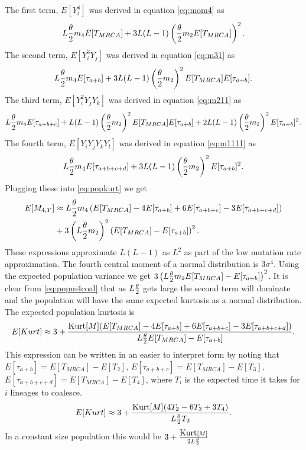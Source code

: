 The first term, $E[Y_i^4]$ was derived in equation \eqref{eq:mom4} as
\begin{equation*}
  L\frac{\theta}{2} m_4 E[T_{MRCA}] + 3L(L-1)\left( \frac{\theta}{2} m_2 E[T_{MRCA}] \right)^2.
\end{equation*}
The second term, $E[Y_i^3Y_j]$ was derived in equation \eqref{eq:m31} as
\begin{equation*}
  L \frac{\theta}{2} m_4 E[\tau_{a+b}] + 3L(L-1) \left(\frac{\theta}{2} m_2\right)^2 E[T_{MRCA}]E[\tau_{a+b}].
\end{equation*}
The third term, $E[Y_i^2Y_jY_k]$ was derived in equation \eqref{eq:m211} as
\begin{equation*}
  L \frac{\theta}{2} m_4 E[\tau_{a+b+c}] + L(L-1)\left(\frac{\theta}{2} m_2\right)^2E[T_{MRCA}]E[\tau_{a+b}] +
  2L(L-1) \left(\frac{\theta}{2} m_2\right)^2E[\tau_{a+b}]^2.
\end{equation*}
The fourth term, $E[Y_iY_jY_kY_l]$ was derived in equation \eqref{eq:m1111} as
\begin{equation*}
  L \frac{\theta}{2} m_4 E[\tau_{a+b+c+d}] + 3L(L-1)\left(\frac{\theta}{2} m_2\right)^2E[\tau_{a+b}]^2.
\end{equation*}
Plugging these into \eqref{eq:popkurt} we get
\begin{align}
  \label{eq:popm4coal}
  E[M_{4,Y}] &\approx L \frac{\theta}{2} m_4 \left( E[T_{MRCA}] - 4E[\tau_{a+b}] + 6E[\tau_{a+b+c}] -3E[\tau_{a+b+c+d}] \right)\nonumber \\
  &+ 3\left( L \frac{\theta}{2} m_2 \right)^2\left(E[T_{MRCA}]- E[\tau_{a+b}]\right)^2.
\end{align}
These expressions approximate $L(L-1)$ as $L^2$ as part of the low mutation rate
approximation. The fourth central moment of a normal distribution is
$3\sigma^4$. Using the expected population variance we get $3\left(L\frac{\theta}{2} m_2
E[T_{MRCA}]- E[\tau_{a+b}]\right)^2$. It is clear from \eqref{eq:popm4coal} that
as $L\frac{\theta}{2}$ gets large the second term will dominate and the population will have
the same expected kurtosis as a normal distribution. The expected population kurtosis
is
\begin{equation*}
  E[Kurt] \approx 3 + \frac{\mbox{Kurt}[M]( E[T_{MRCA}] - 4E[\tau_{a+b}] +
    6E[\tau_{a+b+c}] -3E[\tau_{a+b+c+d}])}{L \frac{\theta}{2} E[T_{MRCA}]- E[\tau_{a+b}]}.
\end{equation*}
This expression can be written in an easier to interpret form by noting that
$E[\tau_{a+b}]=E[T_{MRCA}] - E[T_2]$, $E[\tau_{a+b+c}]=E[T_{MRCA}] - E[T_3]$,
$E[\tau_{a+b+c+d}]=E[T_{MRCA}] - E[T_4]$, where $T_i$ is the expected time it
takes for $i$ lineages to coalesce.
\begin{equation}
  \label{eq:popkurtcoal}
  E[Kurt] \approx 3 + \frac{\mbox{Kurt}[M]( 4T_2 - 6T_3 + 3T_4)}{L \frac{\theta}{2} T_2}.
\end{equation}
In a constant size population this would be $3 + \frac{\mbox{Kurt}[M]}{2L\frac{\theta}{2}}$
